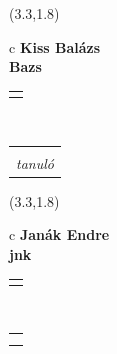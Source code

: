\documentclass[11pt]{article}
\begin{document}
\makebox(3.3,1.8){
  \renewcommand\arraystretch{1.3}
  \begin{tabular}[c]{c}
    \hspace{8.5mm}
    \LARGE\bf{ Kiss Balázs }\\
    \hspace{8.5mm}
    \Large{ Bazs }\\
    \renewcommand\arraystretch{3}
    \begin{tabular}[c]{c}
      \centering
      \fontfamily{phv}\selectfont{
        \textbf{
          \textsc{
            \scriptsize{
            \color{Bright}{ Ismerkedő }\color{Dark}{ Webmester }\color{Dark}{ Sminkmester }\color{Dark}{ Programozó }
            }
          }
        }
      }
    \end{tabular}
    \\
    \renewcommand\arraystretch{1}
    \begin{tabular}{p{3.3in}}
      \hspace{.7cm}\\
      \hspace{.7cm}\emph{ tanuló }\\
    \end{tabular}
  \end{tabular}
}

\makebox(3.3,1.8){
  \renewcommand\arraystretch{1.3}
  \begin{tabular}[c]{c}
    \hspace{8.5mm}
    \LARGE\bf{ Janák Endre }\\
    \hspace{8.5mm}
    \Large{ jnk }\\
    \renewcommand\arraystretch{3}
    \begin{tabular}[c]{c}
      \centering
      \fontfamily{phv}\selectfont{
        \textbf{
          \textsc{
            \scriptsize{
            \color{Bright}{ Ismerkedő }\color{Bright}{ Webmester }\color{Bright}{ Sminkmester }\color{Dark}{ Programozó }
            }
          }
        }
      }
    \end{tabular}
    \\
    \renewcommand\arraystretch{1}
    \begin{tabular}{p{3.3in}}
      \hspace{.7cm}\\
      \hspace{.7cm}\emph{  }\\
    \end{tabular}
  \end{tabular}
}
\end{document}
